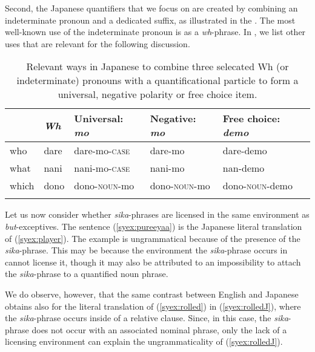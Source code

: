 \documentclass[output=paper]{langscibook}
\begin{document}
Second, the Japanese quantifiers that we focus on are created by combining an indeterminate pronoun and a dedicated suffix, as illustrated in the . The most well-known use of the indeterminate pronoun is as a \emph{wh}-phrase. In , we list other uses that are relevant for the following discussion.

\begin{table}
  \caption{Relevant ways in Japanese to combine three selecated Wh (or indeterminate) pronouns with a quantificational particle to form a universal, negative polarity or free choice item.}\label{tab:usky1}
  \begin{tabular}{*5{l}}
  \lsptoprule
  {} & \emph{Wh} & Universal: \textit{mo} & Negative: \textit{mo} & Free choice: \textit{demo}\\\midrule
  who & dare & dare-mo-\textsc{case} & dare-mo & dare-demo\\
  what & nani & nani-mo-\textsc{case} & nani-mo & nan-demo\\
  which & dono & dono-\textsc{noun}-mo & dono-\textsc{noun}-mo & dono-\textsc{noun}-demo\\
  \lspbottomrule
  \end{tabular}
\end{table}

Let us now consider whether \emph{sika}-phrases are licensed in the same environment as \emph{but}-exceptives.
The sentence (\ref{syex:pureeyaa}) is the Japanese literal translation of (\ref{syex:player}). The example is ungrammatical because of the presence of the  \emph{sika}-phrase.  This may be because the environment the \emph{sika}-phrase occurs in cannot license it, though it may also be attributed to an impossibility to attach the \emph{sika}-phrase to a quantified noun phrase.

\z

We do observe, however, that the same contrast between English and Japanese obtains also for the literal translation of (\ref{syex:rolled}) in (\ref{syex:rolledJ}), where the \emph{sika}-phrase occurs inside of a relative clause.
Since, in this case, the \emph{sika}-phrase does not occur with an associated nominal phrase, only the lack of a licensing environment can explain the ungrammaticality of (\ref{syex:rolledJ}).
\end{document}
